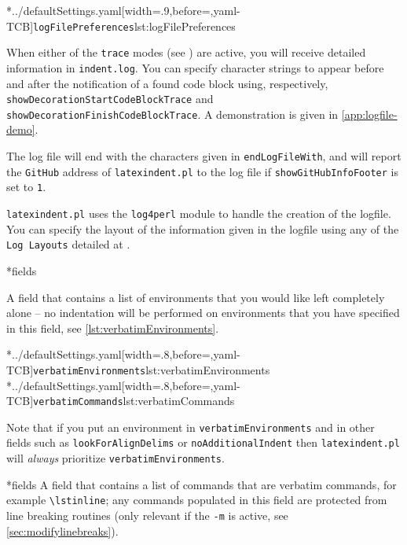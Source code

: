 	\cmhlistingsfromfile[style=logFilePreferences,]*{../defaultSettings.yaml}[width=.9\linewidth,before=\centering,yaml-TCB]{\texttt{logFilePreferences}}{lst:logFilePreferences}

	When%
	 either of the
	\texttt{trace} modes (see ) are active, you will receive
	detailed information in \texttt{indent.log}. You can specify character strings to
	appear before and after the notification of a found code block using, respectively,
	\texttt{showDecorationStartCodeBlockTrace} and \texttt{showDecorationFinishCodeBlockTrace}. A demonstration is given in
	\vref{app:logfile-demo}.

	The log file will end with the characters given in \texttt{endLogFileWith}, and will
	report the \texttt{GitHub} address of \texttt{latexindent.pl} to the log file if
	\texttt{showGitHubInfoFooter} is set to \texttt{1}.

	\texttt{latexindent.pl}%
	 uses the \texttt{log4perl} module \cite{log4perl}
	to handle the creation of the logfile. You can specify the layout of the information
	given in the logfile using any of the \texttt{Log Layouts} detailed at
	\cite{log4perl}.

*{fields}

	A field that contains a list of environments that you would like left completely alone --
	no indentation will be performed on environments that you have specified in this field,
	see \cref{lst:verbatimEnvironments}.

        \begin{cmhtcbraster}[raster column skip=.1\linewidth]
		\cmhlistingsfromfile[style=verbatimEnvironments]*{../defaultSettings.yaml}[width=.8\linewidth,before=\centering,yaml-TCB]{\texttt{verbatimEnvironments}}{lst:verbatimEnvironments}
		\cmhlistingsfromfile[style=verbatimCommands]*{../defaultSettings.yaml}[width=.8\linewidth,before=\centering,yaml-TCB]{\texttt{verbatimCommands}}{lst:verbatimCommands}
        \end{cmhtcbraster}

	Note that if  you put an environment in  \texttt{verbatimEnvironments} and in other fields such
	as \texttt{lookForAlignDelims} or \texttt{noAdditionalIndent} then \texttt{latexindent.pl} will
	\emph{always} prioritize  \texttt{verbatimEnvironments}.

*{fields}
	A field that contains a list of commands that are verbatim commands, for example
	\lstinline|\lstinline|; any commands populated in this field are protected from line
	breaking routines (only relevant if the \texttt{-m} is active, see
	\vref{sec:modifylinebreaks}).

